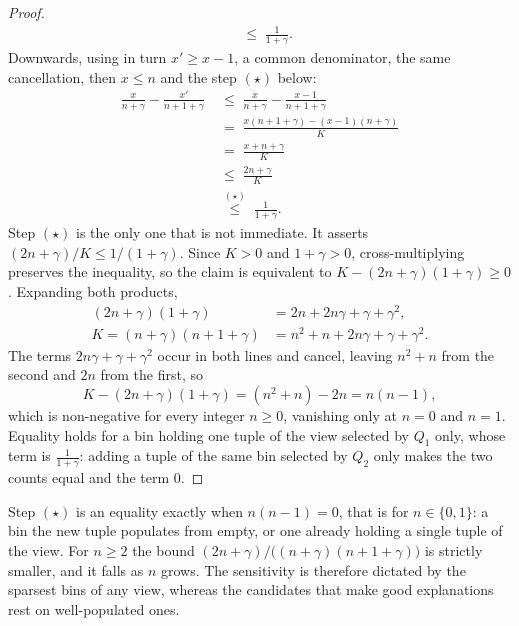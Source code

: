 \begin{proof}
\begin{align*}
&\;\le\;\frac{1}{1+\gamma}.
\end{align*}
Downwards, using in turn $x'\ge x-1$, a common denominator, the same cancellation, then $x\le n$ and the step $(\star)$ below:
\begin{align*}
\frac{x}{n+\gamma}-\frac{x'}{n+1+\gamma}
&\;\le\;\frac{x}{n+\gamma}-\frac{x-1}{n+1+\gamma}\\[2pt]
&\;=\;\frac{x(n+1+\gamma)-(x-1)(n+\gamma)}{K}\\[2pt]
&\;=\;\frac{x+n+\gamma}{K}\\[2pt]
&\;\le\;\frac{2n+\gamma}{K}\\[2pt]
&\;\overset{(\star)}{\le}\;\frac{1}{1+\gamma}.
\end{align*}
Step $(\star)$ is the only one that is not immediate.
It asserts $(2n+\gamma)/K\le 1/(1+\gamma)$.
Since $K>0$ and $1+\gamma>0$, cross-multiplying preserves the inequality, so the claim is equivalent to $K-(2n+\gamma)(1+\gamma)\ge0$.
Expanding both products,
\begin{align*}
(2n+\gamma)(1+\gamma)&=2n+2n\gamma+\gamma+\gamma^2,\\[2pt]
K=(n+\gamma)(n+1+\gamma)&=n^2+n+2n\gamma+\gamma+\gamma^2 .
\end{align*}
The terms $2n\gamma+\gamma+\gamma^2$ occur in both lines and cancel, leaving $n^2+n$ from the second and $2n$ from the first, so
\[
K-(2n+\gamma)(1+\gamma)=(n^2+n)-2n=n(n-1),
\]
which is non-negative for every integer $n\ge0$, vanishing only at $n=0$ and $n=1$.
Equality holds for a bin holding one tuple of the view selected by $Q_1$ only, whose term is $\frac{1}{1+\gamma}$: adding a tuple of the same bin selected by $Q_2$ only makes the two counts equal and the term $0$.
\end{proof}

Step $(\star)$ is an equality exactly when $n(n-1)=0$, that is for $n\in\{0,1\}$: a bin the new tuple populates from empty, or one already holding a single tuple of the view.
For $n\ge2$ the bound $(2n+\gamma)/\big((n+\gamma)(n+1+\gamma)\big)$ is strictly smaller, and it falls as $n$ grows.
The sensitivity is therefore dictated by the sparsest bins of any view, whereas the candidates that make good explanations rest on well-populated ones.

